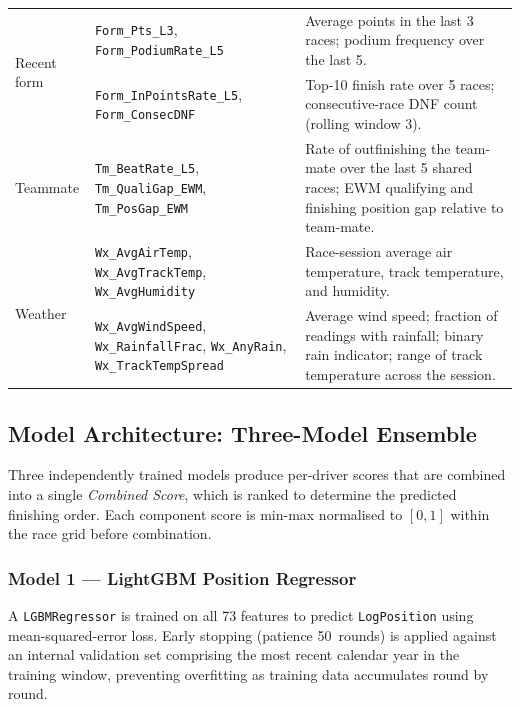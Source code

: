 \documentclass[12pt, a4paper, oneside]{report}
\begin{document}
\begin{table}[H]
\begin{tabularx}{\textwidth}{@{} l l X @{}}
  \midrule
  \multirow{2}{*}{Recent form}
    & \texttt{Form\_Pts\_L3}, \texttt{Form\_PodiumRate\_L5}
      & Average points in the last 3 races; podium frequency over the last 5. \\
    & \texttt{Form\_InPointsRate\_L5}, \texttt{Form\_ConsecDNF}
      & Top-10 finish rate over 5 races; consecutive-race DNF count (rolling window 3). \\
  \midrule
  Teammate
    & \texttt{Tm\_BeatRate\_L5}, \texttt{Tm\_QualiGap\_EWM}, \texttt{Tm\_PosGap\_EWM}
      & Rate of outfinishing the team-mate over the last 5 shared races; EWM qualifying and finishing position gap relative to team-mate. \\
  \midrule
  \multirow{2}{*}{Weather}
    & \texttt{Wx\_AvgAirTemp}, \texttt{Wx\_AvgTrackTemp}, \texttt{Wx\_AvgHumidity}
      & Race-session average air temperature, track temperature, and humidity. \\
    & \texttt{Wx\_AvgWindSpeed}, \texttt{Wx\_RainfallFrac}, \texttt{Wx\_AnyRain}, \texttt{Wx\_TrackTempSpread}
      & Average wind speed; fraction of readings with rainfall; binary rain indicator; range of track temperature across the session. \\
  \bottomrule
\end{tabularx}
\end{table}

\subsection{Model Architecture: Three-Model Ensemble}
\label{subsec:model-arch}

Three independently trained models produce per-driver scores that are combined
into a single \emph{Combined Score}, which is ranked to determine the predicted
finishing order. Each component score is min-max normalised to $[0,1]$ within
the race grid before combination.

\subsubsection*{Model 1 --- LightGBM Position Regressor}

A \texttt{LGBMRegressor} is trained on all 73 features to predict \texttt{LogPosition}
using mean-squared-error loss. Early stopping (patience 50~rounds) is applied
against an internal validation set comprising the most recent calendar year in
the training window, preventing overfitting as training data accumulates round
by round.
\end{document}

